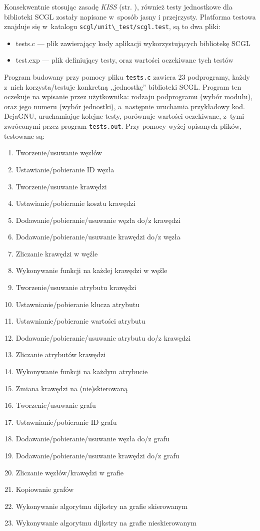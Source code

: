 \documentclass[a4paper,12pt,polish,oneside]{thesis}
\newcommand\code[1]{\lstinline[style=line]{#1}}
\begin{document}
Konsekwentnie stosując zasadę \emph{KISS} (str. \pageref{kiss}), również testy jednostkowe dla biblioteki SCGL zostały napisane w~sposób jasny i przejrzysty.
Platforma testowa znajduje się w~katalogu \code{scgl/unit\_test/scgl.test}, są to dwa pliki:
\begin{itemize}
	\item tests.c --- plik zawierający kody aplikacji wykorzystujących bibliotekę SCGL
	\item test.exp --- plik definiujący testy, oraz wartości oczekiwane tych testów
\end{itemize}
Program budowany przy pomocy pliku \code{tests.c} zawiera 23 podprogramy, każdy z~nich korzysta/testuje konkretną ,,jednostkę'' biblioteki SCGL.
Program ten oczekuje na wpisanie przez użytkownika: rodzaju podprogramu (wybór modułu), oraz jego numeru (wybór jednostki), a~następnie uruchamia przykładowy kod.
DejaGNU, uruchamiając kolejne testy, porównuje wartości oczekiwane, z~tymi zwróconymi przez program \code{tests.out}.
Przy pomocy wyżej opisanych plików, testowane są:
\begin{enumerate}
	\item Tworzenie/usuwanie węzłów
	\item Ustawianie/pobieranie ID węzła
	\item Tworzenie/usuwanie krawędzi
	\item Ustawianie/pobieranie kosztu krawędzi
	\item Dodawanie/pobieranie/usuwanie węzła do/z krawędzi
	\item Dodawanie/pobieranie/usuwanie krawędzi do/z węzła
	\item Zliczanie krawędzi w węźle
	\item Wykonywanie funkcji na każdej krawędzi w węźle
	\item Tworzenie/usuwanie atrybutu krawędzi
	\item Ustawnianie/pobieranie klucza atrybutu
	\item Ustawnianie/pobieranie wartości atrybutu
	\item Dodawanie/pobieranie/usuwanie atrybutu do/z krawędzi
	\item Zliczanie atrybutów krawędzi
	\item Wykonywanie funkcji na każdym atrybucie
	\item Zmiana krawędzi na (nie)skierowaną
	\item Tworzenie/usuwanie grafu
	\item Ustawnianie/pobieranie ID grafu
	\item Dodawanie/pobieranie/usuwanie węzła do/z grafu
	\item Dodawanie/pobieranie/usuwanie krawędzi do/z grafu
	\item Zliczanie węzłów/krawędzi w grafie
	\item Kopiowanie grafów
	\item Wykonywanie algorytmu dijkstry na grafie skierowanym
	\item Wykonywanie algorytmu dijkstry na grafie nieskierowanym
\end{enumerate}
\end{document}
